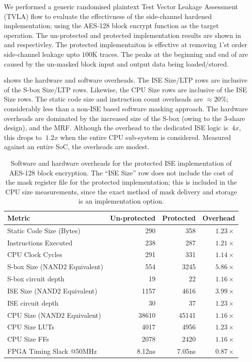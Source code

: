 We performed a generic randomised plaintext
Test Vector Leakage Assessment (TVLA) \cite{TVLA:13}
flow to evaluate the effectivness of the side-channel hardened implementation;
using the AES-128 block encrypt function as the target operation.
The un-protected and protected implementation results are shown in
 and
 respectivley.
The protected implementaiton is effective at removing $1$'st
order side-channel leakage upto $100$K traces.
The peaks at the beginning and end of 
are caused by the un-masked block input and output data being loaded/stored.

 shows the hardware and software overheads.
The ISE Size/LTP rows are inclusive of the S-box Size/LTP rows.
Likewise, the CPU Size rows are inclusive of the ISE Size rows.
The static code size and instruction count overheads are
$\approx 20\%$; considerably less than a non-ISE based software masking
approach.
The hardware overheads are dominated by the increased size of the
S-box (owing to the 3-share design), and the MRF.
Although the overhead to the dedicated
ISE logic is $~4x$, this drops to $~1.2x$ when the entire
CPU sub-system is considered.
Measured against an entire SoC, the overheads are modest.

\begin{table}[]
\centering
\begin{tabular}{|l|r|r|r|}
\hline
Metric  & Un-protected & Protected  & Overhead \\
\hline
\hline
Static Code Size (Bytes)        & 290         & 358    & $1.23\times$   \\
Instructions Executed           & 238         & 287    & $1.21\times$   \\
CPU Clock Cycles                & 291         & 331    & $1.14\times$   \\
\hline
S-box Size (NAND2 Equivalent)   & 554         & 3245   & $5.86\times$   \\
S-box circuit depth             & 19          & 22     & $1.16\times$   \\
ISE Size (NAND2 Equivalent)     & 1157        & 4616   & $3.99\times$   \\
ISE circuit depth               & 30          & 37     & $1.23\times$   \\
CPU Size (NAND2 Equivalent)     & 38610       & 45141  & $1.16\times$   \\
CPU Size  LUTs                  & 4017        & 4956   & $1.23\times$   \\
CPU Size  FFs                   & 2078        & 2420   & $1.16\times$   \\
FPGA Timing Slack @50MHz        & 8.12ns      & 7.05ns & $0.87\times$   \\
\hline
\end{tabular}
\caption{
Software and hardware overheads for the protected ISE implementation
of AES-128 block encryption.
The ``ISE Size'' row does not include the cost of the mask register file
for the protected implementation;
this is included in the CPU size measurements, since the exact method
of mask delivery and storage is an implementation option.
}
\label{tab:sca:sw-hw}
\end{table}

